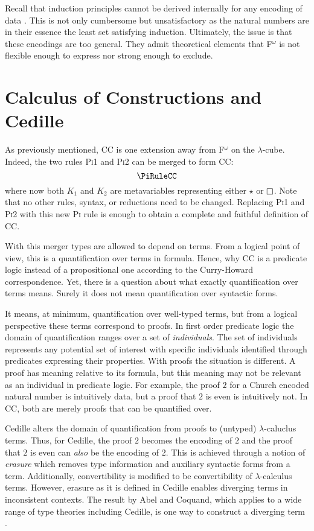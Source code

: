 Recall that induction principles cannot be derived internally for any encoding of data \cite{geuvers2001_noind}.
This is not only cumbersome but unsatisfactory as the natural numbers are in their essence the least set satisfying induction.
Ultimately, the issue is that these encodings are too general.
They admit theoretical elements that F$^\omega$ is not flexible enough to express nor strong enough to exclude.

\section{Calculus of Constructions and Cedille}

As previously mentioned, CC is one extension away from F$^\omega$ on the $\lambda$-cube.
Indeed, the two rules \textsc{Pi1} and \textsc{Pi2} can be merged to form CC:
$$\PiRuleCC$$
where now both $K_1$ and $K_2$ are metavariables representing either $\star$ or $\kind$.
Note that no other rules, syntax, or reductions need to be changed.
Replacing \textsc{Pi1} and \textsc{Pi2} with this new \textsc{Pi} rule is enough to obtain a complete and faithful definition of CC.

With this merger types are allowed to depend on terms.
From a logical point of view, this is a quantification over terms in formula.
Hence, why CC is a predicate logic instead of a propositional one according to the Curry-Howard correspondence.
Yet, there is a question about what exactly quantification over terms means.
Surely it does not mean quantification over syntactic forms.

It means, at minimum, quantification over well-typed terms, but from a logical perspective these terms correspond to proofs.
In first order predicate logic the domain of quantification ranges over a set of \textit{individuals}.
The set of individuals represents any potential set of interest with specific individuals identified through predicates expressing their properties.
With proofs the situation is different.
A proof has meaning relative to its formula, but this meaning may not be relevant as an individual in predicate logic.
For example, the proof $2$ for a Church encoded natural number is intuitively data, but a proof that $2$ is even is intuitively not.
In CC, both are merely proofs that can be quantified over.

Cedille alters the domain of quantification from proofs to (untyped) $\lambda$-caluclus terms.
Thus, for Cedille, the proof $2$ becomes the encoding of $2$ and the proof that $2$ is even can \textit{also} be the encoding of $2$.
This is achieved through a notion of \textit{erasure} which removes type information and auxiliary syntactic forms from a term.
Additionally, convertibility is modified to be convertibility of $\lambda$-calculus terms.
However, erasure as it is defined in Cedille enables diverging terms in inconsistent contexts.
The result by Abel and Coquand, which applies to a wide range of type theories including Cedille, is one way to construct a diverging term \cite{abel2020}.

